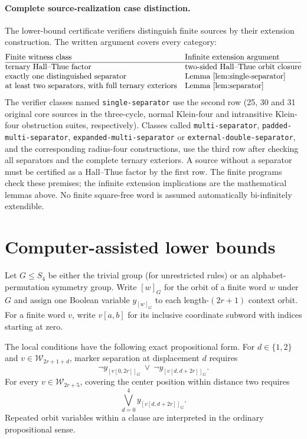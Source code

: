 \documentclass[11pt]{article}
\theoremstyle{remark}
\begin{document}
\paragraph{Complete source-realization case distinction.}
The lower-bound certificate verifiers distinguish finite sources
by their extension construction. The written argument covers
every category:
\[
\begin{array}{@{}ll@{}}
\text{Finite witness class}&\text{Infinite extension argument}\\
\hline
\text{ternary Hall--Thue factor}&
  \text{two-sided Hall--Thue orbit closure}\\
\text{exactly one distinguished separator}&
  \text{Lemma~\ref{lem:single-separator}}\\
\text{at least two separators, with full ternary exteriors}&
  \text{Lemma~\ref{lem:separator}}
\end{array}
\]
The verifier classes named \texttt{single-separator} use
the second row (25, 30 and 31 original core sources
in the three-cycle, normal Klein-four and intransitive
Klein-four obstruction suites, respectively).
Classes called \texttt{multi-separator},
\texttt{padded-multi-separator},
\texttt{expanded-multi-separator} or
\texttt{external-double-separator}, and the corresponding
radius-four constructions, use the third row after
checking all separators and the complete ternary exteriors.
A source without a separator must be certified as a
Hall--Thue factor by the first row. The finite programs
check these premises; the infinite extension implications
are the mathematical lemmas above. No finite square-free
word is assumed automatically bi-infinitely extendible.

\section{Computer-assisted lower bounds}

Let $G\le S_4$ be either the trivial group (for unrestricted
rules) or an alphabet-permutation symmetry group. Write
$[w]_G$ for the orbit of a finite word $w$ under $G$ and
assign one Boolean variable $y_{[w]_G}$ to each length-$(2r+1)$
context orbit. For a finite word $v$, write $v[a,b]$ for
its inclusive coordinate subword with indices starting at zero.

The local conditions have the following exact propositional form.
For $d\in\{1,2\}$ and $v\in\mathcal W_{2r+1+d}$,
marker separation at displacement $d$ requires
\begin{equation}\label{eq:source-separation-clause}
  \neg y_{[v[0,2r]]_G}
  \ \lor\
  \neg y_{[v[d,d+2r]]_G}.
\end{equation}
For every $v\in\mathcal W_{2r+5}$, covering the center
position within distance two requires
\begin{equation}\label{eq:source-cover-clause}
  \bigvee_{d=0}^{4} y_{[v[d,d+2r]]_G}.
\end{equation}
Repeated orbit variables within a clause are interpreted in the
ordinary propositional sense.
\end{document}
